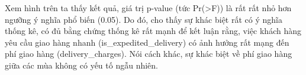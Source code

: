 Xem hình trên ta thấy kết quả, giá trị p-value (tức Pr(>F)) là rất rất nhỏ hơn ngưỡng ý nghĩa phổ biến (0.05). Do đó, cho thấy sự khác biệt rất có ý nghĩa thống kê, có đủ bằng chứng thống kê rất mạnh để kết luận rằng, việc khách hàng yêu cầu giao hàng nhanh (is\_expedited\_delivery) có ảnh hưởng rất mạng đến phí giao hàng (delivery\_charges). Nói cách khác, sự khác biệt về phí giao hàng giữa các mùa không có yếu tố ngẫu nhiên.

